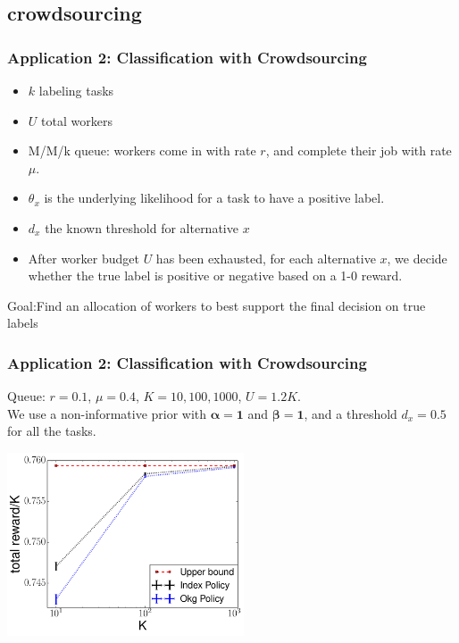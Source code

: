 \documentclass{beamer}
\newcommand{\betav}{\pmb{\beta}}
\newcommand{\alphav}{\pmb{\alpha}}
\begin{document}
\subsection{crowdsourcing}
\begin{frame}[plain]
\frametitle{Application 2: Classification with Crowdsourcing}
\begin{itemize}
\item $k$ labeling tasks
\item $U$ total workers
\item M/M/k queue: workers come in with rate $r$, and complete their job with rate $\mu$.
\item $\theta_x$ is the underlying likelihood for a task to have a positive label.
\item $d_x$ the known threshold for alternative $x$
\item After worker budget $U$ has been exhausted, for each alternative $x$, we decide whether the true label is positive or negative based on a 1-0 reward.
\end{itemize}
{\Large \color{red} Goal:Find an allocation of workers to best support the final decision on true labels}
\end{frame}

\begin{frame}[plain]
\frametitle{Application 2: Classification with Crowdsourcing}
Queue: $r=0.1$, $\mu=0.4$, $K = 10,100,1000$, $U = 1.2K$. \\
We use a non-informative prior with $\alphav = \mathbf{1}$ and $\betav = \mathbf{1}$, and a threshold $d_x = 0.5$ for all the tasks. 
\begin{center}
\includegraphics[width=70mm]{plot_up_sim.pdf}
\end{center}
\end{frame}
\end{document}
